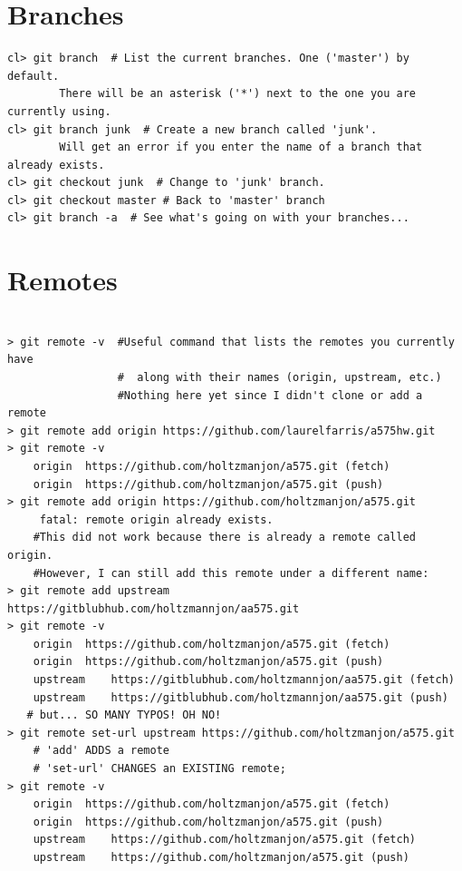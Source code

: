 \documentclass{article}
\begin{document}
\section{Branches}
\begin{verbatim}
cl> git branch  # List the current branches. One ('master') by default.
        There will be an asterisk ('*') next to the one you are currently using.
cl> git branch junk  # Create a new branch called 'junk'.
        Will get an error if you enter the name of a branch that already exists.
cl> git checkout junk  # Change to 'junk' branch.
cl> git checkout master # Back to 'master' branch
cl> git branch -a  # See what's going on with your branches...
\end{verbatim}

\section{Remotes}

\begin{verbatim}

> git remote -v  #Useful command that lists the remotes you currently have
                 #  along with their names (origin, upstream, etc.)
                 #Nothing here yet since I didn't clone or add a remote
> git remote add origin https://github.com/laurelfarris/a575hw.git
> git remote -v
    origin  https://github.com/holtzmanjon/a575.git (fetch)
    origin  https://github.com/holtzmanjon/a575.git (push)
> git remote add origin https://github.com/holtzmanjon/a575.git
     fatal: remote origin already exists.
    #This did not work because there is already a remote called origin.
    #However, I can still add this remote under a different name:
> git remote add upstream https://gitblubhub.com/holtzmannjon/aa575.git
> git remote -v
	origin	https://github.com/holtzmanjon/a575.git (fetch)
	origin	https://github.com/holtzmanjon/a575.git (push)
	upstream	https://gitblubhub.com/holtzmannjon/aa575.git (fetch)
	upstream	https://gitblubhub.com/holtzmannjon/aa575.git (push)
   # but... SO MANY TYPOS! OH NO!
> git remote set-url upstream https://github.com/holtzmanjon/a575.git
    # 'add' ADDS a remote
    # 'set-url' CHANGES an EXISTING remote;
> git remote -v
	origin	https://github.com/holtzmanjon/a575.git (fetch)
	origin	https://github.com/holtzmanjon/a575.git (push)
	upstream	https://github.com/holtzmanjon/a575.git (fetch)
	upstream	https://github.com/holtzmanjon/a575.git (push)

\end{verbatim}
\end{document}
